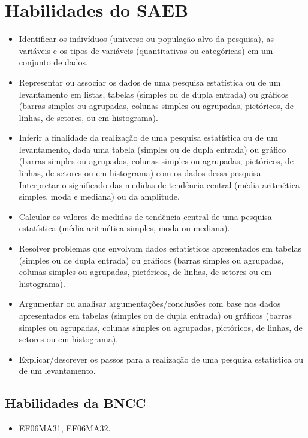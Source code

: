 \section*{Habilidades do SAEB} 
\begin{itemize}
\item Identificar os indivíduos (universo ou
população-alvo da pesquisa), as variáveis e os tipos de variáveis
(quantitativas ou categóricas) em um conjunto de dados.
\item
  Representar ou associar os dados de uma pesquisa estatística ou de um
  levantamento em listas, tabelas (simples ou de dupla entrada) ou
  gráficos (barras simples ou agrupadas, colunas simples ou agrupadas,
  pictóricos, de linhas, de setores, ou em histograma).
\item
  Inferir a finalidade da realização de uma pesquisa estatística ou de
  um levantamento, dada uma tabela (simples ou de dupla entrada) ou
  gráfico (barras simples ou agrupadas, colunas simples ou agrupadas,
  pictóricos, de linhas, de setores ou em histograma) com os dados dessa
  pesquisa. - Interpretar o significado das medidas de tendência central
  (média aritmética simples, moda e mediana) ou da amplitude.
\item
  Calcular os valores de medidas de tendência central de uma pesquisa
  estatística (média aritmética simples, moda ou mediana).
\item
  Resolver problemas que envolvam dados estatísticos apresentados em
  tabelas (simples ou de dupla entrada) ou gráficos (barras simples ou
  agrupadas, colunas simples ou agrupadas, pictóricos, de linhas, de
  setores ou em histograma).
\item
  Argumentar ou analisar argumentações/conclusões com base nos dados
  apresentados em tabelas (simples ou de dupla entrada) ou gráficos
  (barras simples ou agrupadas, colunas simples ou agrupadas,
  pictóricos, de linhas, de setores ou em histograma).
\item
  Explicar/descrever os passos para a realização de uma pesquisa
  estatística ou de um levantamento.
\end{itemize}

\subsection{Habilidades da BNCC}
\begin{itemize} 
\item EF06MA31, EF06MA32.
\end{itemize}


